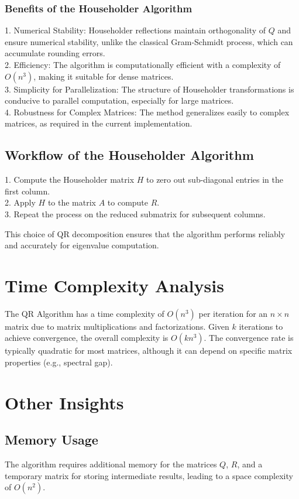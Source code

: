 \documentclass[12pt]{article}
\begin{document}
\subsubsection*{Benefits of the Householder Algorithm}
1. Numerical Stability: Householder reflections maintain orthogonality of \( Q \) and ensure numerical stability, unlike the classical Gram-Schmidt process, which can accumulate rounding errors.\\
2. Efficiency: The algorithm is computationally efficient with a complexity of \( O(n^3) \), making it suitable for dense matrices.\\
3. Simplicity for Parallelization: The structure of Householder transformations is conducive to parallel computation, especially for large matrices.\\
4. Robustness for Complex Matrices: The method generalizes easily to complex matrices, as required in the current implementation.

\subsection*{Workflow of the Householder Algorithm}
1. Compute the Householder matrix \( H \) to zero out sub-diagonal entries in the first column.\\
2. Apply \( H \) to the matrix \( A \) to compute \( R \).\\
3. Repeat the process on the reduced submatrix for subsequent columns.

This choice of QR decomposition ensures that the algorithm performs reliably and accurately for eigenvalue computation.



\section*{Time Complexity Analysis}
The QR Algorithm has a time complexity of \( O(n^3) \) per iteration for an \( n \times n \) matrix due to matrix multiplications and factorizations. Given \( k \) iterations to achieve convergence, the overall complexity is \( O(kn^3) \). The convergence rate is typically quadratic for most matrices, although it can depend on specific matrix properties (e.g., spectral gap).

\section*{Other Insights}
\subsection*{Memory Usage}
The algorithm requires additional memory for the matrices \( Q \), \( R \), and a temporary matrix for storing intermediate results, leading to a space complexity of \( O(n^2) \).
\end{document}

